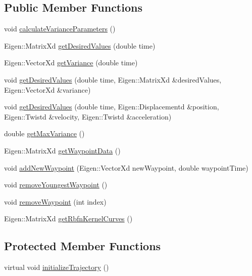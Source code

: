 \subsection*{Public Member Functions}
\begin{DoxyCompactItemize}
\item 
void \hyperlink{classocra_1_1ExperimentalTrajectory_a227d08649657b7951248c0b626808d9e}{calculate\+Variance\+Parameters} ()
\item 
Eigen\+::\+Matrix\+Xd \hyperlink{classocra_1_1ExperimentalTrajectory_a9b9ed4d7b7a96c9a2b33624b5fc1ecf6}{get\+Desired\+Values} (double time)
\item 
Eigen\+::\+Vector\+Xd \hyperlink{classocra_1_1ExperimentalTrajectory_a1c3d421e3b08e2332747c6c3559d8b2d}{get\+Variance} (double time)
\item 
void \hyperlink{classocra_1_1ExperimentalTrajectory_a8d0b41849d2e99a13dd2ef1ae0b0eb46}{get\+Desired\+Values} (double time, Eigen\+::\+Matrix\+Xd \&desired\+Values, Eigen\+::\+Vector\+Xd \&variance)
\item 
void \hyperlink{classocra_1_1ExperimentalTrajectory_a8f920fd57e5207ac784411ba3a2594a3}{get\+Desired\+Values} (double time, Eigen\+::\+Displacementd \&position, Eigen\+::\+Twistd \&velocity, Eigen\+::\+Twistd \&acceleration)
\item 
double \hyperlink{classocra_1_1ExperimentalTrajectory_a76f4aa686308735dec24eec98d4c0ab8}{get\+Max\+Variance} ()
\item 
Eigen\+::\+Matrix\+Xd \hyperlink{classocra_1_1ExperimentalTrajectory_a5a70f13ad9c0a6c8716972dcbe29b2b0}{get\+Waypoint\+Data} ()
\item 
void \hyperlink{classocra_1_1ExperimentalTrajectory_a5bd433112f5712a77e857636ed2dd11b}{add\+New\+Waypoint} (Eigen\+::\+Vector\+Xd new\+Waypoint, double waypoint\+Time)
\item 
void \hyperlink{classocra_1_1ExperimentalTrajectory_a64e0ded52fdbe54ccb85f32c67824d3a}{remove\+Youngest\+Waypoint} ()
\item 
void \hyperlink{classocra_1_1ExperimentalTrajectory_a6b5cdffc1575ca98a73251d6214521a3}{remove\+Waypoint} (int index)
\item 
Eigen\+::\+Matrix\+Xd \hyperlink{classocra_1_1ExperimentalTrajectory_ae3a97f92f11c74f9ffc42c33a8a95149}{get\+Rbfn\+Kernel\+Curves} ()
\end{DoxyCompactItemize}
\subsection*{Protected Member Functions}
\begin{DoxyCompactItemize}
\item 
virtual void \hyperlink{classocra_1_1ExperimentalTrajectory_a4e214517be9848835a63641578e3269d}{initialize\+Trajectory} ()
\end{DoxyCompactItemize}
